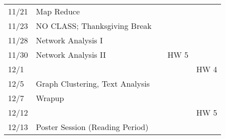 \documentclass[11pt]{article}
\begin{document}
\begin{centering}
\begin{tabular}{||l|p{3in}|l|l|l||}
11/21 & Map Reduce &  & &\\ 
11/23 & NO CLASS; Thanksgiving Break  & & & \\ 
 \hline

11/28 & Network Analysis I &  & & \\ 
11/30 & Network Analysis II &&HW 5 &\\
12/1 &&&& HW 4\\
\hline 

12/5 & Graph Clustering, Text Analysis & & & \\ 
12/7 & Wrapup &  &  &\\ 
\hline 
12/12 &&&& HW 5\\
12/13 & Poster Session (Reading Period) &&& \\

\hline\hline


\end{tabular}\\
\end{centering}
\end{document}
